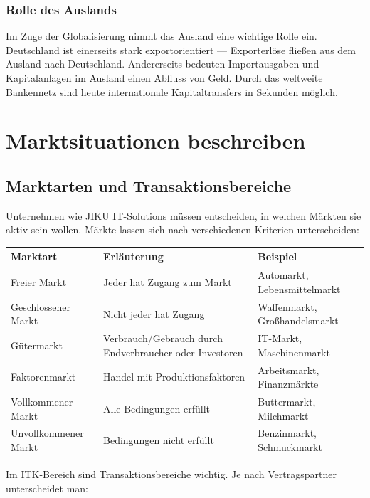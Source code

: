 \documentclass[11pt, a4paper]{article}
\begin{document}
\subsubsection*{Rolle des Auslands}

Im Zuge der Globalisierung nimmt das Ausland eine wichtige Rolle ein. Deutschland ist
einerseits stark exportorientiert --- Exporterlöse fließen aus dem Ausland nach Deutschland.
Andererseits bedeuten Importausgaben und Kapitalanlagen im Ausland einen Abfluss von Geld.
Durch das weltweite Bankennetz sind heute internationale Kapitaltransfers in Sekunden möglich.

\section{Marktsituationen beschreiben}

\subsection{Marktarten und Transaktionsbereiche}

Unternehmen wie JIKU IT-Solutions müssen entscheiden, in welchen Märkten sie aktiv sein wollen.
Märkte lassen sich nach verschiedenen Kriterien unterscheiden:

\begin{center}
\begin{tabular}{p{4cm} p{5cm} p{4cm}}
\toprule
\textbf{Marktart} & \textbf{Erläuterung} & \textbf{Beispiel}\\
\midrule
Freier Markt & Jeder hat Zugang zum Markt & Automarkt, Lebensmittelmarkt\\
\addlinespace
Geschlossener Markt & Nicht jeder hat Zugang & Waffenmarkt, Großhandelsmarkt\\
\addlinespace
Gütermarkt & Verbrauch/Gebrauch durch Endverbraucher oder Investoren & IT-Markt, Maschinenmarkt\\
\addlinespace
Faktorenmarkt & Handel mit Produktionsfaktoren & Arbeitsmarkt, Finanzmärkte\\
\addlinespace
Vollkommener Markt & Alle Bedingungen erfüllt & Buttermarkt, Milchmarkt\\
\addlinespace
Unvollkommener Markt & Bedingungen nicht erfüllt & Benzinmarkt, Schmuckmarkt\\
\bottomrule
\end{tabular}
\end{center}

Im ITK-Bereich sind Transaktionsbereiche wichtig. Je nach Vertragspartner unterscheidet man:
\end{document}

